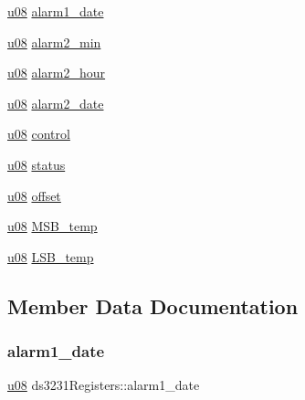\begin{DoxyCompactItemize}
\hyperlink{main_8h_ae2b6b8613a28b013c8c7fdaf93cdb1e1}{u08} \hyperlink{structds3231Registers_add26275f008e4b038ffb663d484e747d}{alarm1\+\_\+date}
\item 
\hyperlink{main_8h_ae2b6b8613a28b013c8c7fdaf93cdb1e1}{u08} \hyperlink{structds3231Registers_a58ad66ef63f7a321acc65f7663b7ead4}{alarm2\+\_\+min}
\item 
\hyperlink{main_8h_ae2b6b8613a28b013c8c7fdaf93cdb1e1}{u08} \hyperlink{structds3231Registers_a0124a783121fa60c419018ada6581c86}{alarm2\+\_\+hour}
\item 
\hyperlink{main_8h_ae2b6b8613a28b013c8c7fdaf93cdb1e1}{u08} \hyperlink{structds3231Registers_a7b09cc58d4f251c1c6eb178d1f308eb5}{alarm2\+\_\+date}
\item 
\hyperlink{main_8h_ae2b6b8613a28b013c8c7fdaf93cdb1e1}{u08} \hyperlink{structds3231Registers_a824cffbe7b947713b1416cb5e86086b3}{control}
\item 
\hyperlink{main_8h_ae2b6b8613a28b013c8c7fdaf93cdb1e1}{u08} \hyperlink{structds3231Registers_a2cf5b9fda6f23f1970409c591251df87}{status}
\item 
\hyperlink{main_8h_ae2b6b8613a28b013c8c7fdaf93cdb1e1}{u08} \hyperlink{structds3231Registers_ad274594b1793d71bfb4d2566013287aa}{offset}
\item 
\hyperlink{main_8h_ae2b6b8613a28b013c8c7fdaf93cdb1e1}{u08} \hyperlink{structds3231Registers_a61a5c925e35aa70c8eeec49be13fed2d}{M\+S\+B\+\_\+temp}
\item 
\hyperlink{main_8h_ae2b6b8613a28b013c8c7fdaf93cdb1e1}{u08} \hyperlink{structds3231Registers_aa437fae662acf2cee0ac2be3b5a34104}{L\+S\+B\+\_\+temp}
\end{DoxyCompactItemize}


\subsection{Member Data Documentation}
\mbox{\label{structds3231Registers_add26275f008e4b038ffb663d484e747d}} 
\subsubsection{\texorpdfstring{alarm1\+\_\+date}{alarm1\_date}}
{\footnotesize\ttfamily \hyperlink{main_8h_ae2b6b8613a28b013c8c7fdaf93cdb1e1}{u08} ds3231\+Registers\+::alarm1\+\_\+date}

